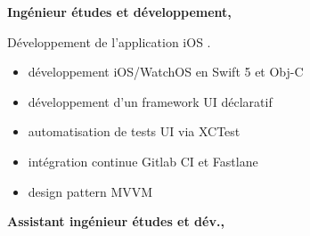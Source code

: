 \documentclass{cv}
\begin{document}
\begin{comment}
\noindent\begin{tikzpicture}[remember picture,overlay]
	\path [fill=solbase2, rounded corners=10] ($(current page.north) + (4.2,-1) $) rectangle (current page.south east);
\end{tikzpicture}
\end{comment}

\pagestyle{empty}

\noindent\begin{minipage}[t]{.65\textwidth}


\newlength{\logoboxwidth}
\setlength{\logoboxwidth}{20mm}

\begin{mainexpbox}[title=nov. 2019 -- aujourd'hui]

	\begin{minipage}[t]{\logoboxwidth}%
	\centering
	\end{minipage}
	\begin{minipage}[t]{0.8\textwidth}
	\textbf{Ingénieur études et développement, \evtech{}}

	Développement de l'application iOS \href{https://apps.apple.com/fr/app/oui-sncf-train-et-bus/id343889987}{}.

	\begin{itemize}
	\item développement iOS/WatchOS en Swift 5 et Obj-C
	\item développement d'un framework UI déclaratif
	\item automatisation de tests UI via XCTest
	\item intégration continue Gitlab CI et Fastlane
	\item design pattern MVVM
	\end{itemize}
	\end{minipage}

\end{mainexpbox}

\begin{expbox}[title={déc. 2016, \faicon{clock-o} 3 ans}]

	\begin{minipage}[t]{\logoboxwidth}
	\centering
	\end{minipage}
	\begin{minipage}[t]{0.8\textwidth}
	\textbf{Assistant ingénieur études et dév., \evtech{}}


\end{minipage}
\end{expbox}
\end{minipage}
\end{document}
